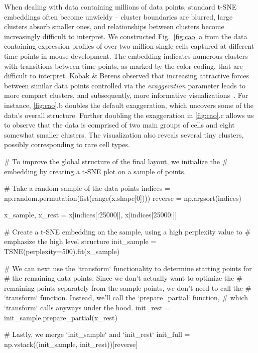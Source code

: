 \documentclass[article]{jss}
\begin{document}
When dealing with data containing millions of data points, standard t-SNE embeddings often become unwieldy -- cluster boundaries are blurred, large clusters absorb smaller ones, and relationships between clusters become increasingly difficult to interpret. We constructed Fig.~\ref{fig:cao}.a from the data containing expression profiles of over two million single cells captured at different time points in mouse development. The embedding indicates numerous clusters with transitions between time points, as marked by the color-coding, that are difficult to interpret. Kobak \& Berens observed that increasing attractive forces between similar data points controlled via the \textit{exaggeration} parameter leads to more compact clusters, and subsequently, more informative visualizations~\citep{kobak2019art}. For instance, \ref{fig:cao}.b doubles the default exaggeration, which uncovers some of the data's overall structure. Further doubling the exaggeration in \ref{fig:cao}.c allows us to observe that the data is comprised of two main groups of cells and eight somewhat smaller clusters. The visualization also reveals several tiny clusters, possibly corresponding to rare cell types.
\begin{CodeChunk}
\begin{CodeInput}
# To improve the global structure of the final layout, we initialize the
# embedding by creating a t-SNE plot on a sample of points.

# Take a random sample of the data points
indices = np.random.permutation(list(range(x.shape[0])))
reverse = np.argsort(indices)

x_sample, x_rest = x[indices[:25000]], x[indices[25000:]]

# Create a t-SNE embedding on the sample, using a high perplexity value to
# emphasize the high level structure
init_sample = TSNE(perplexity=500).fit(x_sample)

# We can next use the `transform` functionality to determine starting points for
# the remaining data points. Since we don't actually want to optimize the
# remaining points separately from the sample points, we don't need to call the
# `transform` function. Instead, we'll call the `prepare_partial` function,
# which `transform` calls anyways under the hood.
init_rest = init_sample.prepare_partial(x_rest)

# Lastly, we merge `init_sample` and `init_rest`
init_full = np.vstack((init_sample, init_rest))[reverse]
\end{CodeInput}
\end{CodeChunk}
\end{document}
